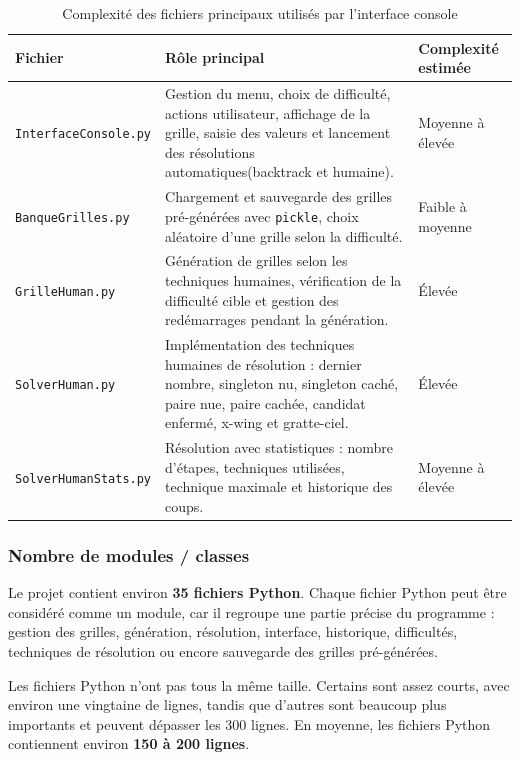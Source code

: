 \documentclass[a4paper]{article}
\begin{document}
\begin{table}[H]
    \centering
    \begin{tabular}{|l|p{6cm}|p{4cm}|}
        \hline
        \textbf{Fichier} & \textbf{Rôle principal} & \textbf{Complexité estimée} \\
        \hline
        \texttt{InterfaceConsole.py} 
        & Gestion du menu, choix de difficulté, actions utilisateur, affichage de la grille, saisie des valeurs et lancement des résolutions automatiques(backtrack et humaine). 
        & Moyenne à élevée \\
        \hline
        \texttt{BanqueGrilles.py} 
        & Chargement et sauvegarde des grilles pré-générées avec \texttt{pickle}, choix aléatoire d'une grille selon la difficulté. 
        & Faible à moyenne \\
        \hline
        \texttt{GrilleHuman.py} 
        & Génération de grilles selon les techniques humaines, vérification de la difficulté cible et gestion des redémarrages pendant la génération. 
        & Élevée \\
        \hline
        \texttt{SolverHuman.py} 
        & Implémentation des techniques humaines de résolution : dernier nombre, singleton nu, singleton caché, paire nue, paire cachée, candidat enfermé, x-wing et gratte-ciel. 
        & Élevée \\
        \hline
        \texttt{SolverHumanStats.py} 
        & Résolution avec statistiques : nombre d'étapes, techniques utilisées, technique maximale et historique des coups. 
        & Moyenne à élevée \\
        \hline
    \end{tabular}
    \caption{Complexité des fichiers principaux utilisés par l'interface console}
    \label{tab:complexite-interface-console}
\end{table}

\subsubsection{Nombre de modules / classes}

Le projet contient environ \textbf{35 fichiers Python}. Chaque fichier Python peut être considéré comme un module, car il regroupe une partie précise du programme : gestion des grilles, génération, résolution, interface, historique, difficultés, techniques de résolution ou encore sauvegarde des grilles pré-générées.

Les fichiers Python n'ont pas tous la même taille. Certains sont assez courts, avec environ une vingtaine de lignes, tandis que d'autres sont beaucoup plus importants et peuvent dépasser les 300 lignes. En moyenne, les fichiers Python contiennent environ \textbf{150 à 200 lignes}.
\end{document}
